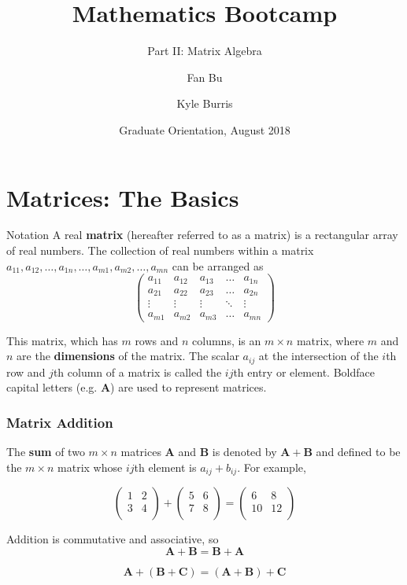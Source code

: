\documentclass{beamer}
\title{Mathematics Bootcamp}
\subtitle{Part II: Matrix Algebra}
\author{Fan Bu\inst{1} \and Kyle Burris\inst{1}}
\institute[Duke University] %
{
  \inst{1}%
  Department of Statistical Science\\
  Duke University
  }
\date{Graduate Orientation, August 2018}
\begin{document}
\begin{frame}
  \titlepage
\end{frame}

\section{Matrices: The Basics}
\begin{frame}{Notation}
A real \textbf{matrix} (hereafter referred to as a matrix) is a rectangular array of real numbers.  The collection of real numbers within a matrix $a_{11}, a_{12}, \hdots, a_{1n}, \hdots, a_{m1}, a_{m2}, \hdots, a_{mn}$ can be arranged as
\[
\begin{pmatrix}
    a_{11} & a_{12} & a_{13} & \dots  & a_{1n} \\
    a_{21} & a_{22} & a_{23} & \dots  & a_{2n} \\
    \vdots & \vdots & \vdots & \ddots & \vdots \\
    a_{m1} & a_{m2} & a_{m3} & \dots  & a_{mn}
\end{pmatrix}
\]

This matrix, which has $m$ rows and $n$ columns, is an $m \times n$ matrix, where $m$ and $n$ are the \textbf{dimensions} of the matrix.  The scalar $a_{ij}$ at the intersection of the $i$th row and $j$th column of a matrix is called the $ij$th entry or element.  Boldface capital letters (e.g. $\mathbf{A}$) are used to represent matrices. \\
\end{frame}

\begin{frame}
\frametitle{Matrix Addition}
The \textbf{sum} of two $m \times n$ matrices $\mathbf{A}$ and $\mathbf{B}$ is denoted by $\mathbf{A} + \mathbf{B}$ and defined to be the $m \times n$ matrix whose $ij$th element is $a_{ij} + b_{ij}$.  For example,

\[
\begin{pmatrix}
    1 & 2\\
    3 & 4 \\
\end{pmatrix}
+
\begin{pmatrix}
    5 & 6\\
    7 & 8 \\
\end{pmatrix}
= 
\begin{pmatrix}
    6 & 8\\
    10 & 12 \\
\end{pmatrix}
\]

Addition is commutative and associative, so 
\[\mathbf{A} + \mathbf{B} = \mathbf{B} + \mathbf{A}\]

\[\mathbf{A} + (\mathbf{B} + \mathbf{C})= (\mathbf{A} + \mathbf{B}) + \mathbf{C}\]
\end{frame}
\end{document}
